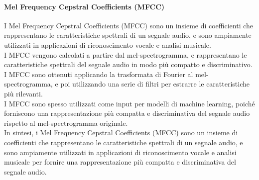 \paragraph{Mel Frequency Cepstral Coefficients (MFCC)}
I Mel Frequency Cepstral Coefficients (MFCC) sono un insieme di coefficienti che rappresentano le caratteristiche spettrali di un segnale audio, e sono ampiamente utilizzati in applicazioni di riconoscimento vocale e analisi musicale.\\
I MFCC vengono calcolati a partire dal mel-spectrogramma, e rappresentano le caratteristiche spettrali del segnale audio in modo più compatto e discriminativo. I MFCC sono ottenuti applicando la trasformata di Fourier al mel-spectrogramma, e poi utilizzando una serie di filtri per estrarre le caratteristiche più rilevanti.\\
I MFCC sono spesso utilizzati come input per modelli di machine learning, poiché forniscono una rappresentazione più compatta e discriminativa del segnale audio rispetto al mel-spectrogramma originale.\\
In sintesi, i Mel Frequency Cepstral Coefficients (MFCC) sono un insieme di coefficienti che rappresentano le caratteristiche spettrali di un segnale audio, e sono ampiamente utilizzati in applicazioni di riconoscimento vocale e analisi musicale per fornire una rappresentazione più compatta e discriminativa del segnale audio.\\
